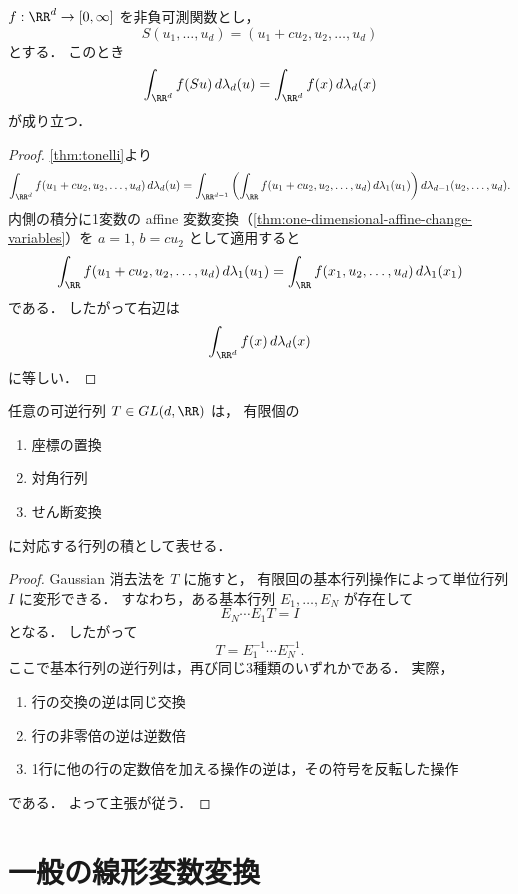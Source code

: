 \begin{lemma}[せん断変換]\label{lem:change-variables-shear}
$f:\RR^d\to[0,\infty]$ を非負可測関数とし，
\[
S(u_1,\dots,u_d)=(u_1+cu_2,u_2,\dots,u_d)
\]
とする．
このとき
\[
\int_{\RR^d}f(Su)\,d\lambda_d(u)=\int_{\RR^d}f(x)\,d\lambda_d(x)
\]
が成り立つ．
\end{lemma}
\begin{proof}
\cref{thm:tonelli}より
\begin{align*}
\int_{\RR^d}f(u_1+cu_2,u_2,\dots,u_d)\,d\lambda_d(u)
=
\int_{\RR^{d-1}}
\left(
\int_{\RR}f(u_1+cu_2,u_2,\dots,u_d)\,d\lambda_1(u_1)
\right)
d\lambda_{d-1}(u_2,\dots,u_d).
\end{align*}
内側の積分に1変数の affine 変数変換（\cref{thm:one-dimensional-affine-change-variables}）を $a=1$, $b=cu_2$ として適用すると
\[
\int_{\RR}f(u_1+cu_2,u_2,\dots,u_d)\,d\lambda_1(u_1)
=
\int_{\RR}f(x_1,u_2,\dots,u_d)\,d\lambda_1(x_1)
\]
である．
したがって右辺は
\[
\int_{\RR^d}f(x)\,d\lambda_d(x)
\]
に等しい．
\end{proof}

\begin{proposition}[可逆行列の分解]\label{prop:invertible-matrix-elementary-decomposition}
任意の可逆行列 $T\in GL(d,\RR)$ は，
有限個の
\begin{enumerate}
    \item 座標の置換
    \item 対角行列
    \item せん断変換
\end{enumerate}
に対応する行列の積として表せる．
\end{proposition}
\begin{proof}
Gaussian 消去法を $T$ に施すと，
有限回の基本行列操作によって単位行列 $I$ に変形できる．
すなわち，ある基本行列 $E_1,\dots,E_N$ が存在して
\[
E_N\cdots E_1T=I
\]
となる．
したがって
\[
T=E_1^{-1}\cdots E_N^{-1}.
\]
ここで基本行列の逆行列は，再び同じ3種類のいずれかである．
実際，
\begin{enumerate}
    \item 行の交換の逆は同じ交換
    \item 行の非零倍の逆は逆数倍
    \item 1行に他の行の定数倍を加える操作の逆は，その符号を反転した操作
\end{enumerate}
である．
よって主張が従う．
\end{proof}

\section{一般の線形変数変換}


